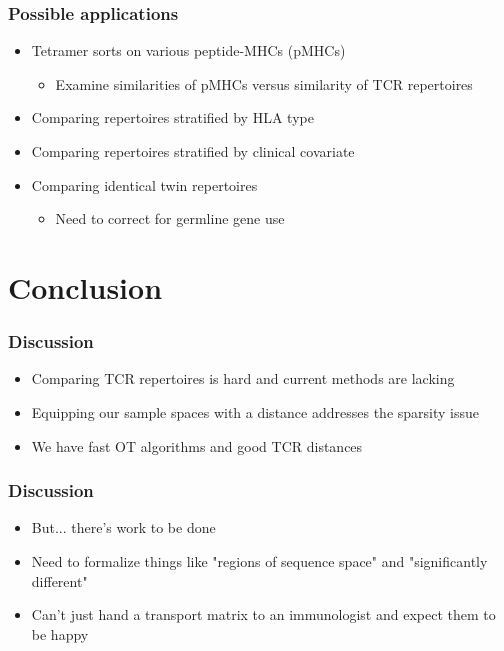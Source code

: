 \documentclass[mathserif,compress,xcolor={dvipsnames}]{beamer}
\renewcommand\;{\,}
\begin{document}
\begin{frame}\frametitle{Possible applications}
\begin{itemize}
\item
Tetramer sorts on various peptide-MHCs (pMHCs)
\medskip
\begin{itemize}
\item
Examine similarities of pMHCs versus similarity of TCR repertoires
\end{itemize}
\medskip
\item
Comparing repertoires stratified by HLA type
\bigskip
\item
Comparing repertoires stratified by clinical covariate
\bigskip
\item
Comparing identical twin repertoires
\medskip
\begin{itemize}
\item
Need to correct for germline gene use
\end{itemize}
\end{itemize}
\end{frame}

\section{Conclusion}

\begin{frame}\frametitle{Discussion}
\begin{itemize}
\item
Comparing TCR repertoires is hard and current methods are lacking
\bigskip
\item
Equipping our sample spaces with a distance addresses the sparsity issue
\bigskip
\item
We have fast OT algorithms and good TCR distances
\end{itemize}
\end{frame}

\begin{frame}\frametitle{Discussion}
\begin{itemize}
\item
But... there's work to be done
\bigskip
\item
Need to formalize things like "regions of sequence space" and "significantly different"
\bigskip
\item
Can't just hand a transport matrix to an immunologist and expect them to be happy
\bigskip
\end{itemize}
\end{frame}
\end{document}
